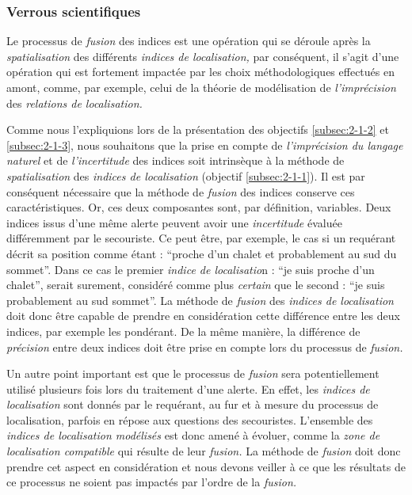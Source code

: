 \subsubsection{Verrous scientifiques}

Le processus de \emph{fusion} des indices est une opération qui se
déroule après la \emph{spatialisation} des différents \emph{indices de
  localisation,} par conséquent, il s'agit d'une opération qui est
fortement impactée par les choix méthodologiques effectués en amont,
comme, par exemple, celui de la théorie de modélisation de
\emph{l'imprécision }des \emph{relations de localisation.}

Comme nous l'expliquions lors de la présentation des objectifs
\ref{subsec:2-1-2} et \ref{subsec:2-1-3}, nous souhaitons que la prise
en compte de \emph{l'imprécision du langage naturel} et de
\emph{l'incertitude} des indices soit intrinsèque à la méthode de
\emph{spatialisation} des \emph{indices de localisation} (objectif
\ref{subsec:2-1-1}). Il est par conséquent nécessaire que la méthode
de \emph{fusion} des indices conserve ces caractéristiques.
% 
Or, ces deux composantes sont, par définition, variables. Deux indices
issus d'une même alerte peuvent avoir une \emph{incertitude} évaluée
différemment par le secouriste. Ce peut être, par exemple, le cas si
un requérant décrit sa position comme étant : \enquote{proche d'un
  chalet et probablement au sud du sommet}. Dans ce cas le premier
\emph{indice de localisatio}n : \enquote{je suis proche d'un chalet},
serait surement, considéré comme plus \emph{certain} que le second :
\enquote{je suis probablement au sud sommet}. La méthode de
\emph{fusion} des \emph{indices de localisation} doit donc être
capable de prendre en considération cette différence entre les deux
indices, par exemple les pondérant. De la même manière, la différence
de \emph{précision} entre deux indices doit être prise en compte lors
du processus de \emph{fusion.}

Un autre point important est que le processus de \emph{fusion} sera
potentiellement utilisé plusieurs fois lors du traitement d'une
alerte. En effet, les \emph{indices de localisation} sont donnés par
le requérant, au fur et à mesure du processus de localisation, parfois
en répose aux questions des secouristes. L'ensemble des \emph{indices
  de localisation modélisés} est donc amené à évoluer, comme la
\emph{zone de localisation compatible} qui résulte de leur
\emph{fusion.} La méthode de \emph{fusion} doit donc prendre cet
aspect en considération et nous devons veiller à ce que les résultats
de ce processus ne soient pas impactés par l'ordre de la
\emph{fusion.}

